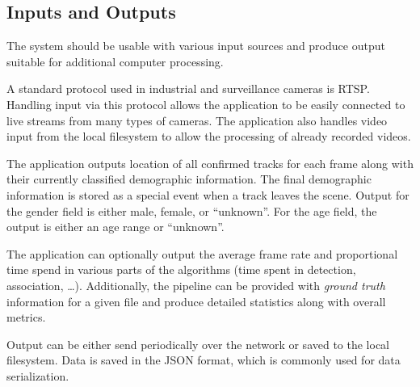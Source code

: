 \subsection{Inputs and Outputs}

The system should be usable with various input sources and produce output suitable for additional computer processing.

A standard protocol used in industrial and surveillance cameras is RTSP\cite{schulzrinne1998real_rtsp}. Handling input via this protocol allows the application to be easily connected to live streams from many types of cameras. The application also handles video input from the local filesystem to allow the processing of already recorded videos.

The application outputs location of all confirmed tracks for each frame along with their currently classified demographic information. The final demographic information is stored as a special event when a track leaves the scene. Output for the gender field is either male, female, or ``unknown''. For the age field, the output is either an age range or ``unknown''.

The application can optionally output the average frame rate and proportional time spend in various parts of the algorithms (time spent in detection, association, \dots{}). Additionally, the pipeline can be provided with \textit{ground truth} information for a given file and produce detailed statistics along with overall metrics.

Output can be either send periodically over the network or saved to the local filesystem. Data is saved in the JSON format, which is commonly used for data serialization.